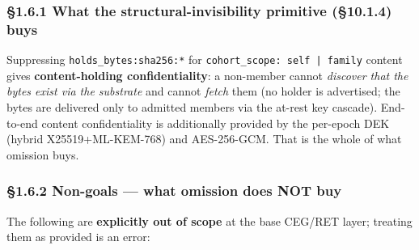 \documentclass[10pt]{article}
\begin{document}
\subsubsection*{§1.6.1 What the structural-invisibility primitive (§10.1.4) buys}

Suppressing \texttt{holds\_bytes:sha256:*} for \texttt{cohort\_scope: self | family} content gives \textbf{content-holding confidentiality}: a non-member cannot \textit{discover that the bytes exist via the substrate} and cannot \textit{fetch} them (no holder is advertised; the bytes are delivered only to admitted members via the at-rest key cascade). End-to-end content confidentiality is additionally provided by the per-epoch DEK (hybrid X25519+ML-KEM-768) and AES-256-GCM. That is the whole of what omission buys.


\subsubsection*{§1.6.2 Non-goals — what omission does NOT buy}

The following are \textbf{explicitly out of scope} at the base CEG/RET layer; treating them as provided is an error:
\end{document}
